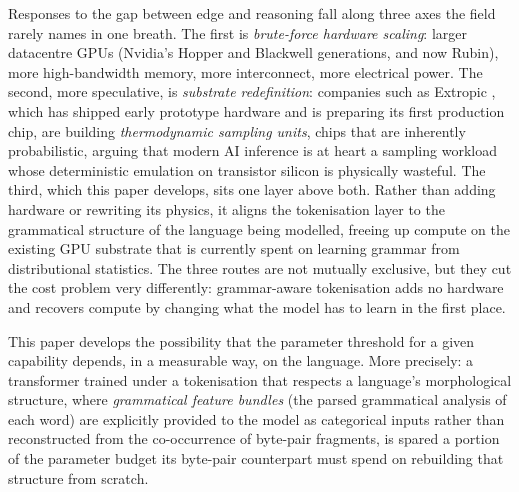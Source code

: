 Responses to the gap between edge and reasoning fall along three axes the field rarely names in one breath. The first is \emph{brute-force hardware scaling}: larger datacentre GPUs (Nvidia's Hopper and Blackwell generations, and now Rubin), more high-bandwidth memory, more interconnect, more electrical power. The second, more speculative, is \emph{substrate redefinition}: companies such as Extropic \citep{extropic2025}, which has shipped early prototype hardware and is preparing its first production chip, are building \emph{thermodynamic sampling units}, chips that are inherently probabilistic, arguing that modern AI inference is at heart a sampling workload whose deterministic emulation on transistor silicon is physically wasteful. The third, which this paper develops, sits one layer above both. Rather than adding hardware or rewriting its physics, it aligns the tokenisation layer to the grammatical structure of the language being modelled, freeing up compute on the existing GPU substrate that is currently spent on learning grammar from distributional statistics. The three routes are not mutually exclusive, but they cut the cost problem very differently: grammar-aware tokenisation adds no hardware and recovers compute by changing what the model has to learn in the first place.

This paper develops the possibility that the parameter threshold for a given capability depends, in a measurable way, on the language. More precisely: a transformer trained under a tokenisation that respects a language's morphological structure, where \emph{grammatical feature bundles} (the parsed grammatical analysis of each word) are explicitly provided to the model as categorical inputs rather than reconstructed from the co-occurrence of byte-pair fragments, is spared a portion of the parameter budget its byte-pair counterpart must spend on rebuilding that structure from scratch.

